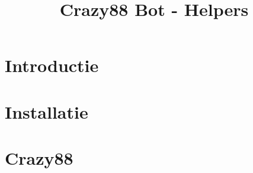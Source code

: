 \documentclass[11pt]{article}
\title{Crazy88 Bot - Helpers}
\begin{document}
    \maketitle

    \section{Introductie}

    \section{Installatie}
    

    \section{Crazy88}
\end{document}
